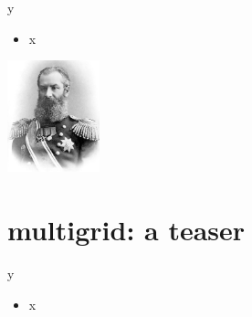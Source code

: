 \documentclass[10pt,
               svgnames,
               hyperref={colorlinks,citecolor=DeepPink4,linkcolor=FireBrick,urlcolor=Maroon},
               usepdftitle=false]{beamer}
\begin{document}
\begin{frame}{y}

\begin{itemize}
\item x
\end{itemize}

\hfill \includegraphics[width=0.2\textwidth]{images/akrylov.jpg}
\end{frame}


\section{multigrid: a teaser}

\begin{frame}{y}

\begin{itemize}
\item x
\end{itemize}
\end{frame}
\end{document}
